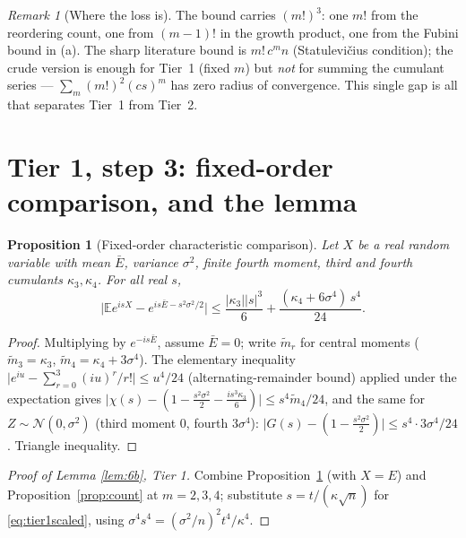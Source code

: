\documentclass[11pt]{article}
\newtheorem{proposition}{Proposition}
\theoremstyle{remark}
\newtheorem{remark}{Remark}
\newcommand{\Ebar}{\bar{E}}
\begin{document}
\begin{remark}[Where the loss is]\label{rem:loss}
The bound carries $(m!)^3$: one $m!$ from the reordering count, one from
$(m-1)!$ in the growth product, one from the Fubini bound in (a). The sharp
literature bound is $m!\,c^m n$ (Statulevi\v{c}ius condition); the crude
version is enough for Tier~1 (fixed $m$) but \emph{not} for summing the
cumulant series --- $\sum_m (m!)^2 (cs)^m$ has zero radius of convergence.
This single gap is all that separates Tier~1 from Tier~2.
\end{remark}

\section{Tier 1, step 3: fixed-order comparison, and the lemma}

\begin{proposition}[Fixed-order characteristic comparison]\label{prop:taylor}
Let $X$ be a real random variable with mean $\Ebar$, variance $\sigma^2$,
finite fourth moment, third and fourth cumulants $\kappa_3,\kappa_4$. For
all real $s$,
\[
\big|\mathbb{E}e^{isX}-e^{is\Ebar-s^2\sigma^2/2}\big|
\le\frac{|\kappa_3||s|^3}{6}+\frac{(\kappa_4+6\sigma^4)\,s^4}{24}.
\]
\end{proposition}

\begin{proof}
Multiplying by $e^{-is\Ebar}$, assume $\Ebar=0$; write $\tilde m_r$ for
central moments ($\tilde m_3=\kappa_3$, $\tilde m_4=\kappa_4+3\sigma^4$).
The elementary inequality
$\big|e^{iu}-\sum_{r=0}^{3}(iu)^r/r!\big|\le u^4/24$ (alternating-remainder
bound) applied under the expectation gives
$\big|\chi(s)-(1-\tfrac{s^2\sigma^2}{2}-\tfrac{is^3\kappa_3}{6})\big|\le
s^4\tilde m_4/24$, and the same for $Z\sim\mathcal N(0,\sigma^2)$ (third
moment $0$, fourth $3\sigma^4$):
$\big|G(s)-(1-\tfrac{s^2\sigma^2}{2})\big|\le s^4\cdot3\sigma^4/24$.
Triangle inequality.
\end{proof}

\begin{proof}[Proof of Lemma \ref{lem:6b}, Tier 1]
Combine Proposition~\ref{prop:taylor} (with $X=E$) and
Proposition~\ref{prop:count} at $m=2,3,4$; substitute $s=t/(\kappa\sqrt n)$
for \eqref{eq:tier1scaled}, using $\sigma^4 s^4=(\sigma^2/n)^2t^4/\kappa^4$.
\end{proof}
\end{document}

